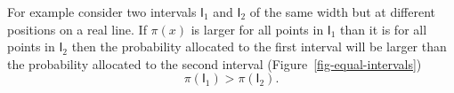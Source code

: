 \documentclass[
  letterpaper,
  DIV=11,
  numbers=noendperiod]{scrartcl}
\begin{document}
For example consider two intervals \(\mathsf{I}_{1}\) and
\(\mathsf{I}_{2}\) of the same width but at different positions on a
real line. If \(\pi(x)\) is larger for all points in \(\mathsf{I}_{1}\)
than it is for all points in \(\mathsf{I}_{2}\) then the probability
allocated to the first interval will be larger than the probability
allocated to the second interval (Figure~\ref{fig-equal-intervals}) \[
\pi(\mathsf{I}_{1}) > \pi(\mathsf{I}_{2}).
\]

\begin{figure}

\begin{minipage}[t]{0.01\linewidth}

{\centering 

~

}

\end{minipage}%
%
\begin{minipage}[t]{0.49\linewidth}

{\centering 


}

\subcaption{\label{fig-equal-intervals}}
\end{minipage}%
%
\begin{minipage}[t]{0.49\linewidth}

{\centering 

}
\end{minipage}
\end{figure}
\end{document}
